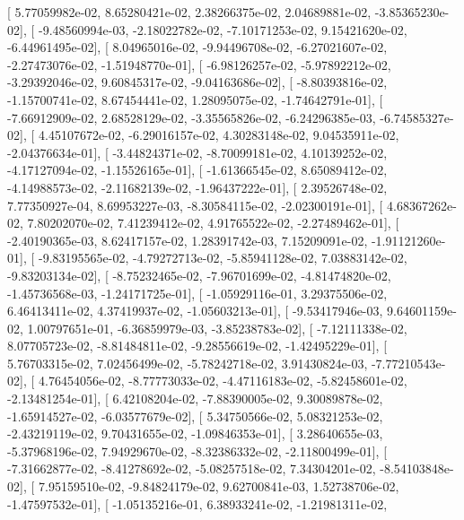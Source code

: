 \documentclass{article}
\begin{document}
       [  5.77059982e-02,   8.65280421e-02,   2.38266375e-02,
          2.04689881e-02,  -3.85365230e-02],
       [ -9.48560994e-03,  -2.18022782e-02,  -7.10171253e-02,
          9.15421620e-02,  -6.44961495e-02],
       [  8.04965016e-02,  -9.94496708e-02,  -6.27021607e-02,
         -2.27473076e-02,  -1.51948770e-01],
       [ -6.98126257e-02,  -5.97892212e-02,  -3.29392046e-02,
          9.60845317e-02,  -9.04163686e-02],
       [ -8.80393816e-02,  -1.15700741e-02,   8.67454441e-02,
          1.28095075e-02,  -1.74642791e-01],
       [ -7.66912909e-02,   2.68528129e-02,  -3.35565826e-02,
         -6.24296385e-03,  -6.74585327e-02],
       [  4.45107672e-02,  -6.29016157e-02,   4.30283148e-02,
          9.04535911e-02,  -2.04376634e-01],
       [ -3.44824371e-02,  -8.70099181e-02,   4.10139252e-02,
         -4.17127094e-02,  -1.15526165e-01],
       [ -1.61366545e-02,   8.65089412e-02,  -4.14988573e-02,
         -2.11682139e-02,  -1.96437222e-01],
       [  2.39526748e-02,   7.77350927e-04,   8.69953227e-03,
         -8.30584115e-02,  -2.02300191e-01],
       [  4.68367262e-02,   7.80202070e-02,   7.41239412e-02,
          4.91765522e-02,  -2.27489462e-01],
       [ -2.40190365e-03,   8.62417157e-02,   1.28391742e-03,
          7.15209091e-02,  -1.91121260e-01],
       [ -9.83195565e-02,  -4.79272713e-02,  -5.85941128e-02,
          7.03883142e-02,  -9.83203134e-02],
       [ -8.75232465e-02,  -7.96701699e-02,  -4.81474820e-02,
         -1.45736568e-03,  -1.24171725e-01],
       [ -1.05929116e-01,   3.29375506e-02,   6.46413411e-02,
          4.37419937e-02,  -1.05603213e-01],
       [ -9.53417946e-03,   9.64601159e-02,   1.00797651e-01,
         -6.36859979e-03,  -3.85238783e-02],
       [ -7.12111338e-02,   8.07705723e-02,  -8.81484811e-02,
         -9.28556619e-02,  -1.42495229e-01],
       [  5.76703315e-02,   7.02456499e-02,  -5.78242718e-02,
          3.91430824e-03,  -7.77210543e-02],
       [  4.76454056e-02,  -8.77773033e-02,  -4.47116183e-02,
         -5.82458601e-02,  -2.13481254e-01],
       [  6.42108204e-02,  -7.88390005e-02,   9.30089878e-02,
         -1.65914527e-02,  -6.03577679e-02],
       [  5.34750566e-02,   5.08321253e-02,  -2.43219119e-02,
          9.70431655e-02,  -1.09846353e-01],
       [  3.28640655e-03,  -5.37968196e-02,   7.94929670e-02,
         -8.32386332e-02,  -2.11800499e-01],
       [ -7.31662877e-02,  -8.41278692e-02,  -5.08257518e-02,
          7.34304201e-02,  -8.54103848e-02],
       [  7.95159510e-02,  -9.84824179e-02,   9.62700841e-03,
          1.52738706e-02,  -1.47597532e-01],
       [ -1.05135216e-01,   6.38933241e-02,  -1.21981311e-02,
\end{document}
